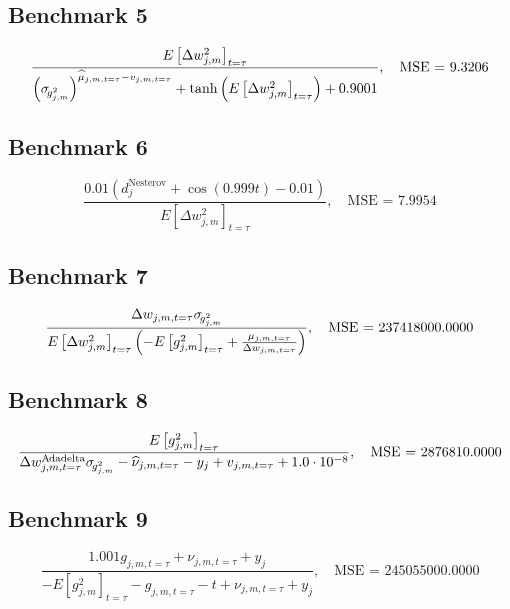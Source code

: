 \subsection*{Benchmark 5}
\begin{equation}
\label{eq:benchmark-5}
\frac{E\left[\Delta w_{j, m}^2\right]_{t=\tau}}{\left(\sigma_{\hspace{-.05cm}g^{2}_{j,m}}\right)^{\widehat{\mu}_{j,m,t=\tau} - v_{j, m, t=\tau}} + \tanh{\left(E\left[\Delta w_{j, m}^2\right]_{t=\tau} \right)} + 0.9001}, \quad \text{MSE = } 9.3206
\end{equation}


\subsection*{Benchmark 6}
\begin{equation}
\label{eq:benchmark-6}
\frac{0.01 \left(d_{j}^{\mathrm{Nesterov}} + \cos{\left(0.999 t \right)} - 0.01\right)}{E\left[\Delta w_{j, m}^2\right]_{t=\tau}}, \quad \text{MSE = } 7.9954
\end{equation}


\subsection*{Benchmark 7}
\begin{equation}
\label{eq:benchmark-7}
\frac{\Delta w_{j, m, t=\tau} \sigma_{\hspace{-.05cm}g^{2}_{j,m}}}{E\left[\Delta w_{j, m}^2\right]_{t=\tau} \left(- E\left[g_{j, m}^2\right]_{t=\tau} + \frac{\mu_{j,m,t=\tau}}{\Delta w_{j, m, t=\tau}}\right)}, \quad \text{MSE = } 237418000.0000
\end{equation}


\subsection*{Benchmark 8}
\begin{equation}
\label{eq:benchmark-8}
\frac{E\left[g_{j, m}^2\right]_{t=\tau}}{\Delta w^{\text{A}\hspace{-.018cm}\text{dadelta}}_{j, m, t=\tau} \sigma_{\hspace{-.05cm}g^{2}_{j,m}} - \widehat{\nu}_{j,m,t=\tau} - y_{j} + v_{j, m, t=\tau} + 1.0 \cdot 10^{-8}}, \quad \text{MSE = } 2876810.0000
\end{equation}


\subsection*{Benchmark 9}
\begin{equation}
\label{eq:benchmark-9}
\frac{1.001 g_{j, m, t=\tau} + \nu_{j,m,t=\tau} + y_{j}}{- E\left[g_{j, m}^2\right]_{t=\tau} - g_{j, m, t=\tau} - t + \nu_{j,m,t=\tau} + y_{j}}, \quad \text{MSE = } 245055000.0000
\end{equation}


